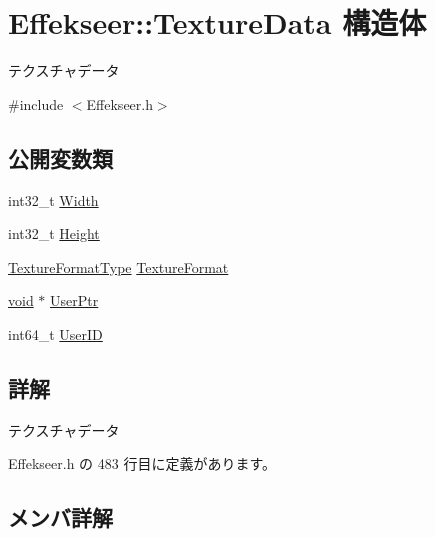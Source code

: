 \hypertarget{struct_effekseer_1_1_texture_data}{}\section{Effekseer\+:\+:Texture\+Data 構造体}
\label{struct_effekseer_1_1_texture_data}


テクスチャデータ  




{\ttfamily \#include $<$Effekseer.\+h$>$}

\subsection*{公開変数類}
\begin{DoxyCompactItemize}
\item 
int32\+\_\+t \mbox{\hyperlink{struct_effekseer_1_1_texture_data_ab1391055f7b4bf482c89469de1061e08}{Width}}
\item 
int32\+\_\+t \mbox{\hyperlink{struct_effekseer_1_1_texture_data_a0f166cd56ce89be41bba7609d612ee87}{Height}}
\item 
\mbox{\hyperlink{namespace_effekseer_ad44c2314bf2d674ae0e6d62db6ff4484}{Texture\+Format\+Type}} \mbox{\hyperlink{struct_effekseer_1_1_texture_data_a5ac6643229c4057700611562d3d5a1fb}{Texture\+Format}}
\item 
\mbox{\hyperlink{namespace_effekseer_ab34c4088e512200cf4c2716f168deb56}{void}} $\ast$ \mbox{\hyperlink{struct_effekseer_1_1_texture_data_aad80a00cb49b0822befc1dd213ee8b8b}{User\+Ptr}}
\item 
int64\+\_\+t \mbox{\hyperlink{struct_effekseer_1_1_texture_data_a5f513f3b26e5d1b6b3de376c7263ad66}{User\+ID}}
\end{DoxyCompactItemize}


\subsection{詳解}
テクスチャデータ 

 Effekseer.\+h の 483 行目に定義があります。



\subsection{メンバ詳解}
\mbox{\label{struct_effekseer_1_1_texture_data_a0f166cd56ce89be41bba7609d612ee87}} 
